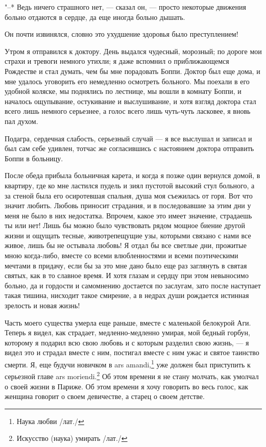 "--* Ведь  ничего страшного нет,  --- сказал он, ---  просто некоторые
движения больно отдаются в сердце, да еще иногда больно дышать.

Он почти извинялся, словно это ухудшение здоровья было преступлением!

Утром  я отправился  к доктору.  День выдался  чудесный, морозный;  по
дороге  мои  страхи  и  тревоги  немного утихли;  я  даже  вспомнил  о
приближающемся Рождестве и  стал думать, чем бы  мне порадовать Боппи.
Доктор был еще дома, и  мне удалось уговорить его немедленно осмотреть
больного. Мы поехали в его  удобной коляске, мы поднялись по лестнице,
мы  вошли  в  комнату  Боппи, и  началось  ощупывание,  остукивание  и
выслушивание, и хотя взгляд доктора стал всего лишь немного серьезнее,
а голос всего лишь чуть-чуть ласковее, я вновь пал духом.

Подагра, сердечная  слабость, серьезный  случай ---  я все  выслушал и
записал и  был сам себе  удивлен, тотчас же согласившись  с настоянием
доктора отправить Боппи в больницу.

После обеда прибыла  больничная карета, и когда я  позже один вернулся
домой, в квартиру, где ко мне  ластился пудель и зиял пустотой высокий
стул  больного, а  за стеной  была его  осиротевшая спальня,  душа моя
съежилась от горя. Вот что значит любить. Любовь приносит страдания, и
в последовавшие за этим дни у  меня не было в них недостатка. Впрочем,
какое это  имеет значение, страдаешь  ты или  нет! Лишь бы  можно было
чувствовать  рядом  мощное  биение  другой  жизни  и  ощущать  тесные,
животрепещущие  узы, которыми  связано с  нами все  живое, лишь  бы не
остывала любовь! Я отдал бы все светлые дни, прожитые мною когда-либо,
вместе со всеми влюбленностями и всеми поэтическими мечтами в придачу,
если бы за это мне дано было  еще раз заглянуть в святая святых, как в
то славное время.  И хотя глазам и сердцу при  этом невыносимо больно,
да и гордости и самомнению достается по заслугам, зато после наступает
такая  тишина, нисходит  такое  смирение, а  в  недрах души  рождается
истинная зрелость и новая жизнь!

Часть моего существа  умерла еще раньше, вместе  с маленькой белокурой
Аги.  Теперь  я видел,  как  страдает,  медленно-медленно умирая,  мой
бедный горбун, которому я подарил всю свою любовь и с которым разделил
свою жизнь,  --- я видел это  и страдал вместе с  ним, постигал вместе
с  ним  ужас и  святое  таинство  смерти.  Я,  еще будучи  новичком  в
ars  amandi,\footnote{Наука любви  /лат./} уже  должен был  приступить
к  серьезной главе  ars  moriendi.\footnote{Искусство (наука)  умирать
/лат./} Об этом времени я не  стану молчать, как умолчал о своей жизни
в Париже. Об  этом времени я хочу говорить во  весь голос, как женщина
говорит о своем девичестве, а старец о своем детстве.

